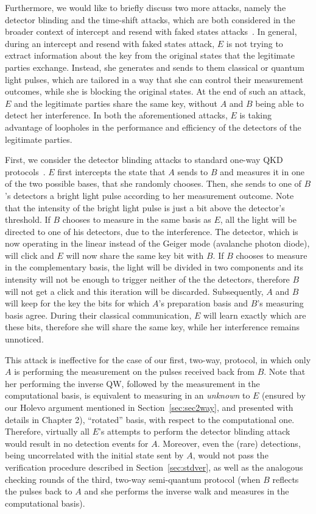 Furthermore, we would like to briefly discuss two more attacks, namely the detector blinding and the time-shift attacks, which are both considered in the broader context of intercept and resend with faked states attacks~\cite{liz:lop:lop:16}.  In general, during an intercept and resend with faked states attack, $E$ is not trying to extract information about the key from the original states that the legitimate parties exchange. Instead, she generates and sends to them classical or quantum light pulses, which are tailored in a way that she can control their measurement outcomes, while she is blocking the original states. At the end of such an attack, $E$ and the legitimate parties share the same key, without $A$ and $B$ being able to detect her interference. In both the aforementioned attacks, $E$ is taking advantage of loopholes in the performance and efficiency of the detectors of the legitimate parties. 

First, we consider the detector blinding attacks to standard one-way QKD protocols~\cite{lyd:wie:wit:els:ska:mak:10,wie:lyd:wit:els:ska:mar:mak:leu:11}. $E$ first intercepts the state that $A$ sends to $B$ and measures it in one of the two possible bases, that she randomly chooses. Then, she sends to one of $B$'s detectors a bright light pulse according to her measurement outcome. Note that the intensity of the bright light pulse is just a bit above the detector's threshold. If $B$ chooses to measure in the same basis as $E$, all the light will be directed to one of his detectors, due to the interference. The detector, which is now operating in the linear instead of the Geiger mode (avalanche photon diode), will click and $E$ will now share the same key bit with $B$. If $B$ chooses to measure in the complementary basis, the light will be divided in two components and its intensity will not be enough to trigger neither of the the detectors, therefore $B$ will not get a click and this iteration will be discarded. Subsequently, $A$ and $B$ will keep for the key the bits for which $A$'s preparation basis and $B$'s measuring basis agree. During their classical communication, $E$ will learn exactly which are these bits, therefore she will share the same key, while her interference remains unnoticed. 

This attack is ineffective for the case of our first, two-way, protocol, in which only $A$ is performing the measurement on the pulses received back from $B$. Note that her performing the inverse QW, followed by the measurement in the computational basis, is equivalent to measuring in an {\em unknown} to $E$ (ensured by our Holevo argument mentioned in Section~\ref{sec:sec2way}, and presented with details in Chapter 2), ``rotated'' basis, with respect to the computational one. Therefore, virtually all $E$'s attempts to perform the detector blinding attack would result in no detection events for $A$. Moreover, even the (rare) detections, being uncorrelated with the initial state sent by $A$, would not pass the verification procedure described in Section~\ref{sec:stdver}, as well as the analogous checking rounds of the third, two-way semi-quantum protocol (when $B$ reflects the pulses back to $A$ and she performs the inverse walk and measures in the computational basis).

